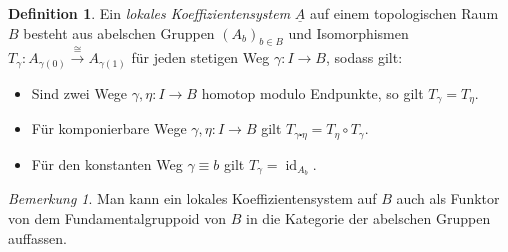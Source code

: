 \documentclass[11pt, a4paper, german]{article}
\theoremstyle{definition}
\newtheorem{bsp}{Beispiel}
\newtheorem{defn}{Definition}
\theoremstyle{remark}
\newtheorem*{bem}{Bemerkung}
\DeclareMathOperator{\id}{id} %
\begin{document}
\iffalse

Sei im Folgenden $B$ wegzusammenhängend.
Wir haben gezeigt, dass dann alle Fasern diesselbe Kohomologiegruppen besitzen.
Wir können also von der Kohomologie der Faser $F$ sprechen, wobei $F \coloneqq p^{-1}(b_0)$ für ein beliebiges $b_0 \in B$.
Die Fundamentalgruppe $\pi_1(B, b_0)$ operiert auf $H^*(F)$ durch $[\gamma] \mapsto T_\gamma$.

\begin{defn}
  Ein \emph{Bündel von Gruppen} auf einem topologischen Raum $B$ besteht aus einer Gruppe $G$, einer Abbildung $q : A \to B$ und Bijektionen $g_b : q^{-1}(b) \xrightarrow{\cong} G$ für alle $b \in B$, welche den Fasern von $q$ eine zu $G$ isomorphe Gruppenstruktur verleihen, sodass gilt:
  Für jeden Punkt $x \in B$ gibt es eine Umgebung $U \subset B$, sodass
  \[
    g_U : q^{-1}(U) \to U \times G, \quad
    y \mapsto (q(y), g_{q(y)}(y))
  \]
  stetig und sogar ein Homöomorphismus ist.
\end{defn}

\begin{bsp}
  Sei $G$ eine Gruppe.
  Die Projektion $B \times G \to B$ ist in kanonischer Weise ein Bündel von Gruppen auf $B$.
\end{bsp}
\fi


\begin{defn}
  Ein \emph{lokales Koeffizientensystem} $\underline{A}$ auf einem topologischen Raum $B$ besteht aus abelschen Gruppen $(A_b)_{b \in B}$ und Isomorphismen $T_\gamma : A_{\gamma(0)} \xrightarrow{\cong} A_{\gamma(1)}$ für jeden stetigen Weg $\gamma : I \to B$, sodass gilt:
  \begin{itemize}
    \item Sind zwei Wege $\gamma, \eta : I \to B$ homotop modulo Endpunkte, so gilt $T_\gamma = T_\eta$.
    \item Für komponierbare Wege $\gamma, \eta : I \to B$ gilt $T_{\gamma \centerdot \eta} = T_\eta \circ T_\gamma$.
    \item Für den konstanten Weg $\gamma \equiv b$ gilt $T_\gamma = \id_{A_b}$.
  \end{itemize}
\end{defn}

\begin{bem}
  Man kann ein lokales Koeffizientensystem auf $B$ auch als Funktor von dem Fundamentalgruppoid von $B$ in die Kategorie der abelschen Gruppen auffassen.
\end{bem}
\end{document}
